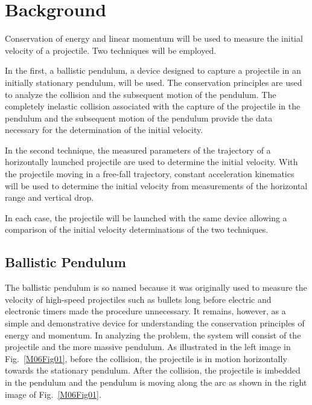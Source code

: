 
\label{lab:M6}

\section{Background}

Conservation of energy and linear momentum will be used to measure the initial velocity of a projectile.  Two techniques will be employed.

In the first, a ballistic pendulum, a device designed to capture a projectile in an initially stationary pendulum, will be used.  The conservation principles are used to analyze the collision and the subsequent motion of the pendulum.  The completely inelastic collision associated with the capture of the projectile in the pendulum and the subsequent motion of the pendulum provide the data necessary for the determination of the initial velocity.

In the second technique, the measured parameters of the trajectory of a horizontally launched projectile are used to determine the initial velocity.  With the projectile moving in a free-fall trajectory, constant acceleration kinematics will be used to determine the initial velocity from measurements of the horizontal range and vertical drop.

In each case, the projectile will be launched with the same device allowing a comparison of the initial velocity determinations of the two techniques.




\subsection{Ballistic Pendulum}

The ballistic pendulum is so named because it was originally used to measure the velocity of high-speed projectiles such as bullets long before electric and electronic timers made the procedure unnecessary.  It remains, however, as a simple and demonstrative device for understanding the conservation principles of energy and momentum.  In analyzing the problem, the system will consist of the projectile and the more massive pendulum.  As illustrated in the left image in Fig.~\ref{M06Fig01}, before the collision, the projectile is in motion horizontally towards the stationary pendulum.  After the collision, the projectile is imbedded in the pendulum and the pendulum is moving along the arc as shown in the right image of Fig.~\ref{M06Fig01}.

